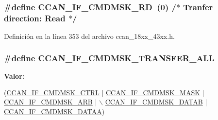 \subsubsection[{\texorpdfstring{C\+C\+A\+N\+\_\+\+I\+F\+\_\+\+C\+M\+D\+M\+S\+K\+\_\+\+RD}{CCAN_IF_CMDMSK_RD}}]{\setlength{\rightskip}{0pt plus 5cm}\#define C\+C\+A\+N\+\_\+\+I\+F\+\_\+\+C\+M\+D\+M\+S\+K\+\_\+\+RD~(0)				/$\ast$  Tranfer direction\+: Read $\ast$/}\hypertarget{group___c_c_a_n__18_x_x__43_x_x_gada076fb09a2b3ce5d331f6f9beae6eec}{}\label{group___c_c_a_n__18_x_x__43_x_x_gada076fb09a2b3ce5d331f6f9beae6eec}


Definición en la línea 353 del archivo ccan\+\_\+18xx\+\_\+43xx.\+h.

\subsubsection[{\texorpdfstring{C\+C\+A\+N\+\_\+\+I\+F\+\_\+\+C\+M\+D\+M\+S\+K\+\_\+\+T\+R\+A\+N\+S\+F\+E\+R\+\_\+\+A\+LL}{CCAN_IF_CMDMSK_TRANSFER_ALL}}]{\setlength{\rightskip}{0pt plus 5cm}\#define C\+C\+A\+N\+\_\+\+I\+F\+\_\+\+C\+M\+D\+M\+S\+K\+\_\+\+T\+R\+A\+N\+S\+F\+E\+R\+\_\+\+A\+LL}\hypertarget{group___c_c_a_n__18_x_x__43_x_x_ga482a5f777327c83363e30dd9c8b99be3}{}\label{group___c_c_a_n__18_x_x__43_x_x_ga482a5f777327c83363e30dd9c8b99be3}
{\bfseries Valor\+:}
\begin{DoxyCode}
(\hyperlink{group___c_c_a_n__18_x_x__43_x_x_gaa2862e76860e6f72b4ce8b60f0b059ed}{CCAN\_IF\_CMDMSK\_CTRL} | \hyperlink{group___c_c_a_n__18_x_x__43_x_x_ga673357c85c5be8938668a77bcfed270b}{CCAN\_IF\_CMDMSK\_MASK} | 
      \hyperlink{group___c_c_a_n__18_x_x__43_x_x_ga568752f6d7905cff72c156242b34f381}{CCAN\_IF\_CMDMSK\_ARB} | \hyperlink{group___c_c_a_n__18_x_x__43_x_x_ga51b44e8b4e1dc3c1701fb6b352ce200a}{\(\backslash\)}
\hyperlink{group___c_c_a_n__18_x_x__43_x_x_ga51b44e8b4e1dc3c1701fb6b352ce200a}{                                     CCAN\_IF\_CMDMSK\_DATAB} | 
      \hyperlink{group___c_c_a_n__18_x_x__43_x_x_ga6c0cbbac4aa6768663bde8a577bba92a}{CCAN\_IF\_CMDMSK\_DATAA})
\end{DoxyCode}


